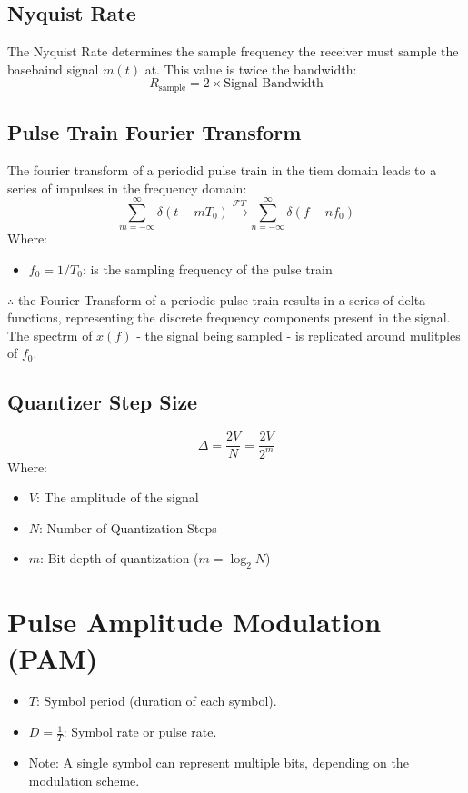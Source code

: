 \documentclass[10pt]{article}
\begin{document}
\subsection{Nyquist Rate}
The Nyquist Rate determines the sample frequency the receiver must sample the basebaind signal $m(t)$ at. This value is twice the bandwidth: 
\[
    R_{\text{sample}} = 2 \times \text{Signal Bandwidth}
\]
\subsection{Pulse Train Fourier Transform}
The fourier transform of a periodid pulse train in the tiem domain leads to a series of impulses in the frequency domain:
\[
    \sum_{m=-\infty}^{\infty} \delta(t - m T_0) \xrightarrow{\mathcal{F}T} \sum_{n=-\infty}^{\infty} \delta(f - n f_0)
\]
\noindent Where:
\begin{itemize}
    \item $f_0=1/T_0$: is the sampling frequency of the pulse train
\end{itemize}

\noindent $\therefore$ the Fourier Transform of a periodic pulse train results in a series of delta functions, representing the discrete frequency components present in the signal. The spectrm of $x(f)$ - the signal being sampled - is replicated around mulitples of $f_0$.

\subsection{Quantizer Step Size}
\[
    \Delta = \frac{2V}{N} = \frac{2V}{2^m}
\]
\noindent Where:
\begin{itemize}
    \item $V$: The amplitude of the signal
    \item $N$: Number of Quantization Steps
    \item $m$: Bit depth of quantization ($m=\log_2{N}$)
\end{itemize}

\section{Pulse Amplitude Modulation (PAM)}

\begin{itemize}
    \item \( T \): Symbol period (duration of each symbol).
    \item \( D = \frac{1}{T} \): Symbol rate or pulse rate.

    \item Note: A single symbol can represent multiple bits, depending on the modulation scheme.
\end{itemize}
\end{document}
